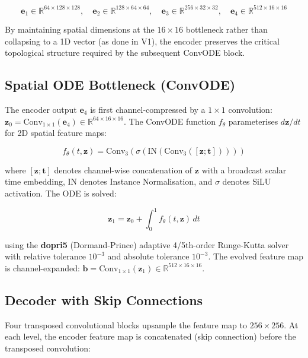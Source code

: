 \begin{equation}
\mathbf{e}_1 \in \mathbb{R}^{64 \times 128 \times 128}, \quad \mathbf{e}_2 \in \mathbb{R}^{128 \times 64 \times 64}, \quad \mathbf{e}_3 \in \mathbb{R}^{256 \times 32 \times 32}, \quad \mathbf{e}_4 \in \mathbb{R}^{512 \times 16 \times 16}
\end{equation}

By maintaining spatial dimensions at the $16 \times 16$ bottleneck rather than collapsing to a 1D vector (as done in V1), the encoder preserves the critical topological structure required by the subsequent ConvODE block.

\subsection{Spatial ODE Bottleneck (ConvODE)}

The encoder output $\mathbf{e}_4$ is first channel-compressed by a $1\times1$ convolution: $\mathbf{z}_0 = \text{Conv}_{1\times1}(\mathbf{e}_4) \in \mathbb{R}^{64 \times 16 \times 16}$. The ConvODE function $f_\theta$ parameterises $d\mathbf{z}/dt$ for 2D spatial feature maps:

\begin{equation}
    f_\theta(t, \mathbf{z}) = \text{Conv}_3(\sigma(\text{IN}(\text{Conv}_3([\mathbf{z}; \mathbf{t}]))))
\end{equation}

where $[\mathbf{z}; \mathbf{t}]$ denotes channel-wise concatenation of $\mathbf{z}$ with a broadcast scalar time embedding, IN denotes Instance Normalisation, and $\sigma$ denotes SiLU activation. The ODE is solved:

\begin{equation}
    \mathbf{z}_1 = \mathbf{z}_0 + \int_0^1 f_\theta(t, \mathbf{z})\, dt
\end{equation}

using the \textbf{dopri5} (Dormand-Prince) adaptive 4/5th-order Runge-Kutta solver with relative tolerance $10^{-3}$ and absolute tolerance $10^{-3}$. The evolved feature map is channel-expanded: $\mathbf{b} = \text{Conv}_{1\times1}(\mathbf{z}_1) \in \mathbb{R}^{512 \times 16 \times 16}$.

\subsection{Decoder with Skip Connections}

Four transposed convolutional blocks upsample the feature map to $256 \times 256$. At each level, the encoder feature map is concatenated (skip connection) before the transposed convolution:

